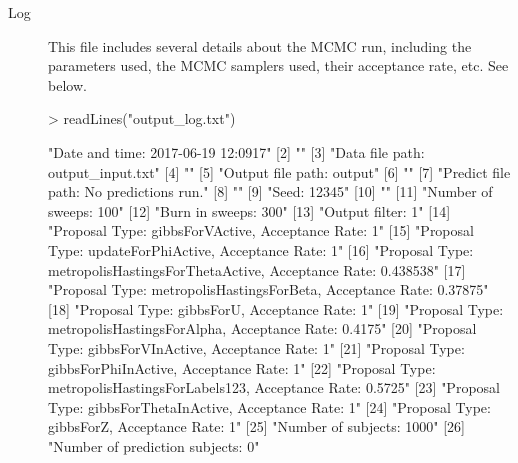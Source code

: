 \documentclass{article}
\begin{document}
\begin{description}
\item[Log] This file includes several details about the MCMC run, including the parameters used, the MCMC samplers used, their acceptance rate, etc. See below. 

\begin{Schunk}
\begin{Sinput}
> readLines("output_log.txt")
\end{Sinput}
\begin{Soutput}
 [1] "Date and time: 2017-06-19 12:0917"                                         
 [2] ""                                                                          
 [3] "Data file path: output_input.txt"                                          
 [4] ""                                                                          
 [5] "Output file path: output"                                                  
 [6] ""                                                                          
 [7] "Predict file path: No predictions run."                                    
 [8] ""                                                                          
 [9] "Seed: 12345"                                                               
[10] ""                                                                          
[11] "Number of sweeps: 100"                                                     
[12] "Burn in sweeps: 300"                                                       
[13] "Output filter: 1"                                                          
[14] "Proposal Type: gibbsForVActive, Acceptance Rate: 1"                        
[15] "Proposal Type: updateForPhiActive, Acceptance Rate: 1"                     
[16] "Proposal Type: metropolisHastingsForThetaActive, Acceptance Rate: 0.438538"
[17] "Proposal Type: metropolisHastingsForBeta, Acceptance Rate: 0.37875"        
[18] "Proposal Type: gibbsForU, Acceptance Rate: 1"                              
[19] "Proposal Type: metropolisHastingsForAlpha, Acceptance Rate: 0.4175"        
[20] "Proposal Type: gibbsForVInActive, Acceptance Rate: 1"                      
[21] "Proposal Type: gibbsForPhiInActive, Acceptance Rate: 1"                    
[22] "Proposal Type: metropolisHastingsForLabels123, Acceptance Rate: 0.5725"    
[23] "Proposal Type: gibbsForThetaInActive, Acceptance Rate: 1"                  
[24] "Proposal Type: gibbsForZ, Acceptance Rate: 1"                              
[25] "Number of subjects: 1000"                                                  
[26] "Number of prediction subjects: 0"                                          

\end{Soutput}
\end{Schunk}
\end{description}
\end{document}

